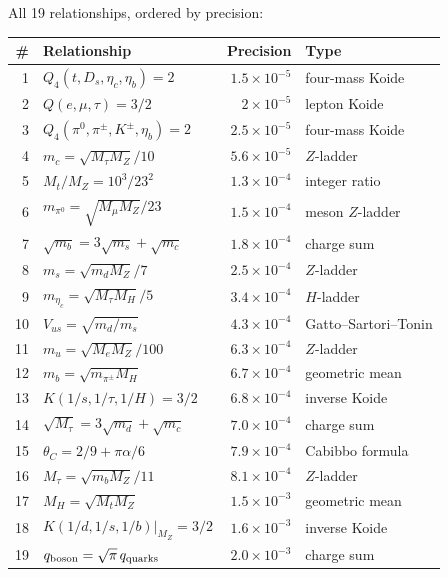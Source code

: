 \documentclass[11pt]{article}
\begin{document}
All 19 relationships, ordered by precision:

\begin{center}\scriptsize
\setlength{\tabcolsep}{3pt}
\begin{tabular}{@{}r l r l@{}}
\toprule
\# & Relationship & Precision & Type \\
\midrule
1 & $Q_4(t,D_s,\eta_c,\eta_b)=2$ & $1.5\times 10^{-5}$ & four-mass Koide \\
2 & $Q(e,\mu,\tau) = 3/2$ & $2\times 10^{-5}$ & lepton Koide \\
3 & $Q_4(\pi^0,\pi^\pm,K^\pm,\eta_b)=2$ & $2.5\times 10^{-5}$ & four-mass Koide \\
4 & $m_c = \sqrt{M_\tau M_Z}/10$ & $5.6\times 10^{-5}$ & $Z$-ladder \\
5 & $M_t/M_Z = 10^3/23^2$ & $1.3\times 10^{-4}$ & integer ratio \\
6 & $m_{\pi^0} = \sqrt{M_\mu M_Z}/23$ & $1.5\times 10^{-4}$ & meson $Z$-ladder \\
7 & $\sqrt{m_b}=3\sqrt{m_s}+\sqrt{m_c}$ & $1.8\times 10^{-4}$ & charge sum \\
8 & $m_s = \sqrt{m_d M_Z}/7$ & $2.5\times 10^{-4}$ & $Z$-ladder \\
9 & $m_{\eta_c}=\sqrt{M_\tau M_H}/5$ & $3.4\times 10^{-4}$ & $H$-ladder \\
10 & $V_{us}=\sqrt{m_d/m_s}$ & $4.3\times 10^{-4}$ & Gatto--Sartori--Tonin \\
11 & $m_u = \sqrt{M_e M_Z}/100$ & $6.3\times 10^{-4}$ & $Z$-ladder \\
12 & $m_b = \sqrt{m_{\pi^\pm}M_H}$ & $6.7\times 10^{-4}$ & geometric mean \\
13 & $K(1/s,1/\tau,1/H)=3/2$ & $6.8\times 10^{-4}$ & inverse Koide \\
14 & $\sqrt{M_\tau}=3\sqrt{m_d}+\sqrt{m_c}$ & $7.0\times 10^{-4}$ & charge sum \\
15 & $\theta_C = 2/9+\pi\alpha/6$ & $7.9\times 10^{-4}$ & Cabibbo formula \\
16 & $M_\tau = \sqrt{m_b M_Z}/11$ & $8.1\times 10^{-4}$ & $Z$-ladder \\
17 & $M_H = \sqrt{M_t M_Z}$ & $1.5\times 10^{-3}$ & geometric mean \\
18 & $K(1/d,1/s,1/b)|_{M_Z}=3/2$ & $1.6\times 10^{-3}$ & inverse Koide \\
19 & $q_{\rm boson}=\sqrt{\pi}\,q_{\rm quarks}$ & $2.0\times 10^{-3}$ & charge sum \\
\bottomrule
\end{tabular}
\end{center}
\end{document}
